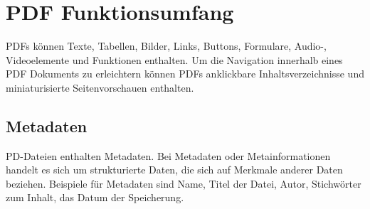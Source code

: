 \section{PDF Funktionsumfang}
PDFs können Texte, Tabellen, Bilder, Links, Buttons, Formulare, Audio-, Videoelemente und Funktionen enthalten.
Um die Navigation innerhalb eines PDF Dokuments zu erleichtern können PDFs anklickbare Inhaltsverzeichnisse und miniaturisierte Seitenvorschauen enthalten.

\subsection{Metadaten}
PD-Dateien enthalten Metadaten. Bei Metadaten oder Metainformationen handelt es sich um strukturierte Daten, die sich auf Merkmale anderer Daten beziehen. Beispiele für Metadaten sind Name, Titel der Datei, Autor, Stichwörter zum Inhalt, das Datum der Speicherung.